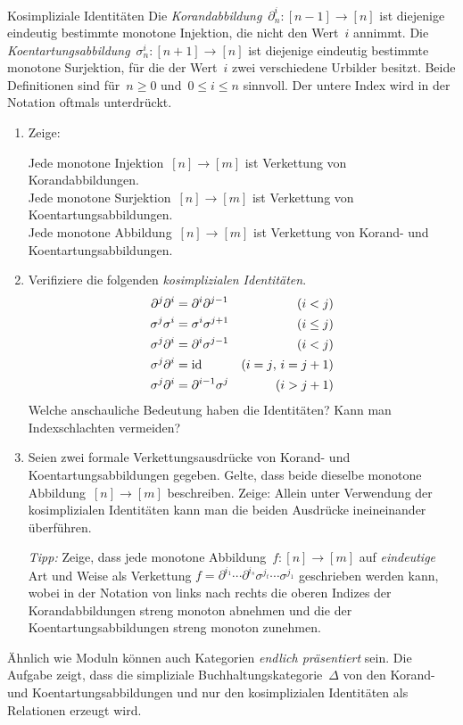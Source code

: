 \documentclass{uebblatt}
\begin{document}
\begin{aufgabe}{Kosimpliziale Identitäten}
Die \emph{Korandabbildung}~$\partial^i_n : [n-1] \to
[n]$ ist diejenige eindeutig bestimmte monotone Injektion, die nicht den
Wert~$i$ annimmt. Die \emph{Koentartungsabbildung}~$\sigma^i_n : [n+1] \to [n]$
ist diejenige eindeutig bestimmte monotone Surjektion, für die der Wert~$i$
zwei verschiedene Urbilder besitzt. Beide Definitionen sind für~$n \geq 0$
und~$0 \leq i \leq n$ sinnvoll. Der untere Index wird in der Notation oftmals
unterdrückt.
\begin{enumerate}
\item Zeige:

Jede monotone Injektion~\tabto{4.55cm}$[n] \to [m]$ ist Verkettung
von Korandabbildungen. \\
Jede monotone Surjektion~\tabto{4.55cm}$[n] \to [m]$ ist
Verkettung von Koentartungsabbildungen. \\
Jede monotone Abbildung~\tabto{4.55cm}$[n] \to [m]$
ist Verkettung von Korand- und Koentartungsabbildungen.

\item Verifiziere die folgenden \emph{kosimplizialen Identitäten}.
\begin{align*}
  \partial^j \partial^i &= \partial^i \partial^{j-1} & \text{($i < j$)} \\
  \sigma^j \sigma^i &= \sigma^i \sigma^{j+1} & \text{($i \leq j$)} \\
  \sigma^j \partial^i &= \partial^i \sigma^{j-1} & \text{($i < j$)} \\
  \sigma^j \partial^i &= \mathrm{id} & \text{($i = j$, $i = j+1$)} \\
  \sigma^j \partial^i &= \partial^{i-1} \sigma^j & \text{($i > j + 1$)} 
\end{align*}
Welche anschauliche Bedeutung haben die Identitäten? Kann man
Indexschlachten vermeiden?

\item Seien zwei formale Verkettungsausdrücke von Korand- und
Koentartungsabbildungen gegeben. Gelte, dass beide dieselbe monotone
Abbildung~$[n] \to [m]$ beschreiben. Zeige: Allein unter Verwendung der
kosimplizialen Identitäten kann man die beiden Ausdrücke ineineinander
überführen.

\emph{Tipp:} Zeige, dass jede monotone Abbildung~$f : [n] \to [m]$ auf
\emph{eindeutige} Art und Weise als Verkettung
$f = \partial^{i_1} \cdots \partial^{i_s} \sigma^{j_t} \cdots \sigma^{j_1}$
geschrieben werden kann, wobei in der Notation von links nach rechts die oberen
Indizes der Korandabbildungen streng monoton abnehmen und die der
Koentartungsabbildungen streng monoton zunehmen.
\end{enumerate}

Ähnlich wie Moduln können auch Kategorien \emph{endlich präsentiert} sein.
Die Aufgabe zeigt, dass die simpliziale Buchhaltungskategorie~$\Delta$ von
den Korand- und Koentartungsabbildungen und nur den kosimplizialen Identitäten als
Relationen erzeugt wird.
\end{aufgabe}
\end{document}
